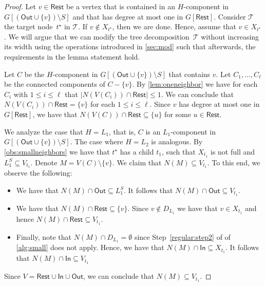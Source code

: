 \documentclass[a4paper,UKenglish,cleveref, autoref, thm-restate, numberwithinsect]{lipics-v2021}
\newcommand{\In}{\mathsf{In}}
\newcommand{\Out}{\mathsf{Out}}
\newcommand{\Rest}{\mathsf{Rest}}
\begin{document}
\begin{proof}
Let $v\in\Rest$ be a vertex that is contained in an $H$-component in $G[(\Out\cup\{v\})\setminus S]$ and that has degree at most one in $G[\Rest]$. 
Consider $\mathcal{T}$ the target node~$t^\star$ in $\mathcal{T}$.
If $v\notin X_{t^\star}$, then we are done. 
Hence, assume that $v\in X_{t^\star}$. 
We will argue that we can modify the tree decomposition~$\mathcal{T}$ without increasing its width using the operations introduced in \cref{sec:mod} such that afterwards, the requirements in the lemma statement hold.

Let $C$ be the $H$-component in $G[(\Out\cup\{v\})\setminus S]$ that contains $v$. 
 Let $C_1,\ldots,C_\ell$ be the connected components of $C-\{v\}$. By \cref{lem:oneneighbor} we have for each $C_i$ with $1\le i\le \ell$ that $|N(V(C_i))\cap\Rest|\le 1$. We can conclude that $N(V(C_i))\cap\Rest=\{v\}$ for each $1\le i\le \ell$. Since $v$ has degree at most one in $G[\Rest]$, we have that $N(V(C))\cap \Rest\subseteq\{u\}$ for some $u\in \Rest$. 


We analyze the case that $H=L_1$, that is, $C$ is an $L_1$-component in $G[(\Out\cup\{v\})\setminus S]$.
The case where $H=L_2$ is analogous.
By \cref{obs:smallneighbors} we have that ${t^\star}$ has a child $t_1$, such that $X_{t_1}$ is not full and $L^S_1\subseteq V_{t_1}$. 
        Denote $M=V(C)\setminus \{v\}$.
        We claim that $N(M)\subseteq V_{t_1}$. 
 To this end, we observe the following:
         \begin{itemize}
             \item We have that $N(M)\cap \Out\subseteq L_1^S$. It follows that $N(M)\cap \Out\subseteq V_{t_1}$. 
             \item We have that $N(M)\cap \Rest\subseteq \{v\}$. Since $v\notin D_{L_1}$ we have that $v\in X_{t_1}$ and hence $N(M)\cap \Rest\subseteq V_{t_1}$.
             \item Finally, note that $N(M)\cap D_{L_1}=\emptyset$ since Step~\ref{regular:step2} of of \cref{alg:small} does not apply. Hence, we have that $N(M)\cap \In\subseteq X_{t_1}$. It follows that $N(M)\cap \In\subseteq V_{t_1}$
         \end{itemize}
         Since $V=\Rest\cup\In\cup\Out$, we can conclude that $N(M)\subseteq V_{t_1}$.
        



\end{proof}
\end{document}
